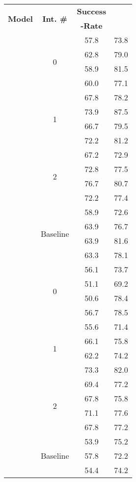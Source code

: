 \begin{table}
\centering
  \small
  \begin{tabular}{|c | c c c|}
    \toprule
    \multirow{2}{*}{\textbf{Model}} & \multirow{2}{*}{\textbf{Int. \#}} & \textbf{Success{}} & \multirow{2}{*}{\textbf{\precision{}}} \\
     &  & \textbf{-Rate{}} &  \\
    
\midrule
\multirow{16}{*}{\qwen{}} & \multirow{4}{*}{0} & 57.8 & 73.8 \\
 & & 62.8 & 79.0 \\
 & & 58.9 & 81.5 \\
 & & 60.0 & 77.1 \\
\cline{2-4}
 & \multirow{4}{*}{1} & 67.8 & 78.2 \\
 & & 73.9 & 87.5 \\
 & & 66.7 & 79.5 \\
 & & 72.2 & 81.2 \\
\cline{2-4}
 & \multirow{4}{*}{2}  & 67.2 & 72.9 \\
 & & 72.8 & 77.5 \\
 & & 76.7 & 80.7 \\
 & & 72.2 & 77.4 \\
\cline{2-4}
 & \multirow{4}{*}{Baseline} & 58.9 & 72.6 \\
 & & 63.9 & 76.7 \\
 & & 63.9 & 81.6 \\
 & & 63.3 & 78.1 \\
\midrule
\multirow{16}{*}{\llama{}} & \multirow{4}{*}{0} & 56.1 & 73.7 \\
 & & 51.1 & 69.2 \\
 & & 50.6 & 78.4 \\
 & & 56.7 & 78.5 \\
\cline{2-4}
 & \multirow{4}{*}{1} & 55.6 & 71.4 \\
 & & 66.1 & 75.8 \\
 & & 62.2 & 74.2 \\
 & & 73.3 & 82.0 \\
\cline{2-4}
 & \multirow{4}{*}{2} & 69.4 & 77.2 \\
 & & 67.8 & 75.8 \\
 & & 71.1 & 77.6 \\
 & & 67.8 & 77.2 \\
\cline{2-4}
 & \multirow{4}{*}{Baseline} & 53.9 & 75.2 \\
 & & 57.8 & 72.2 \\
 & & 54.4 & 74.2 \\

\end{tabular}
\end{table}
